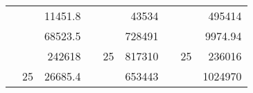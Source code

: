 \begin{table}[H]
\begin{tabular}{|ccrccrccc}
\rowcolor[HTML]{DAE8FC} 
\multicolumn{1}{|c|}{\cellcolor[HTML]{FFFFC7}}                                & \multicolumn{1}{c|}{\cellcolor[HTML]{DAE8FC}}                      & \multicolumn{1}{r|}{\cellcolor[HTML]{DAE8FC}11451.8}   & \multicolumn{1}{c|}{\cellcolor[HTML]{FFFFC7}}                                & \multicolumn{1}{c|}{\cellcolor[HTML]{DAE8FC}}                       & \multicolumn{1}{r|}{\cellcolor[HTML]{DAE8FC}43534}     & \multicolumn{1}{c|}{\cellcolor[HTML]{FFFFC7}}                                & \multicolumn{1}{c|}{\cellcolor[HTML]{DAE8FC}}                      & \multicolumn{1}{r|}{\cellcolor[HTML]{DAE8FC}495414}    \\ \cline{3-3} \cline{6-6} \cline{9-9} 
\multicolumn{1}{|c|}{\cellcolor[HTML]{FFFFC7}}                                & \multicolumn{1}{c|}{\cellcolor[HTML]{DAE8FC}}                      & \multicolumn{1}{r|}{\cellcolor[HTML]{DDFDFF}68523.5}   & \multicolumn{1}{c|}{\cellcolor[HTML]{FFFFC7}}                                & \multicolumn{1}{c|}{\cellcolor[HTML]{DAE8FC}}                       & \multicolumn{1}{r|}{\cellcolor[HTML]{DDFDFF}728491}    & \multicolumn{1}{c|}{\cellcolor[HTML]{FFFFC7}}                                & \multicolumn{1}{c|}{\cellcolor[HTML]{DAE8FC}}                      & \multicolumn{1}{r|}{\cellcolor[HTML]{DDFDFF}9974.94}   \\ \cline{3-3} \cline{6-6} \cline{9-9} 
\rowcolor[HTML]{DAE8FC} 
\multicolumn{1}{|c|}{\cellcolor[HTML]{FFFFC7}}                                & \multicolumn{1}{c|}{\cellcolor[HTML]{DAE8FC}}                      & \multicolumn{1}{r|}{\cellcolor[HTML]{DAE8FC}242618}    & \multicolumn{1}{c|}{\cellcolor[HTML]{FFFFC7}}                                & \multicolumn{1}{c|}{\multirow{-9}{*}{\cellcolor[HTML]{DAE8FC}25}}   & \multicolumn{1}{r|}{\cellcolor[HTML]{DAE8FC}817310}    & \multicolumn{1}{c|}{\cellcolor[HTML]{FFFFC7}}                                & \multicolumn{1}{c|}{\multirow{-9}{*}{\cellcolor[HTML]{DAE8FC}25}}  & \multicolumn{1}{r|}{\cellcolor[HTML]{DAE8FC}236016}    \\ \cline{3-3} \cline{5-6} \cline{8-9} 
\multicolumn{1}{|c|}{\cellcolor[HTML]{FFFFC7}}                                & \multicolumn{1}{c|}{\multirow{-10}{*}{\cellcolor[HTML]{DAE8FC}25}} & \multicolumn{1}{r|}{\cellcolor[HTML]{DDFDFF}26685.4}   & \multicolumn{1}{c|}{\cellcolor[HTML]{FFFFC7}}                                & \multicolumn{1}{c|}{\cellcolor[HTML]{DDFDFF}}                       & \multicolumn{1}{r|}{\cellcolor[HTML]{DAE8FC}653443}    & \multicolumn{1}{c|}{\cellcolor[HTML]{FFFFC7}}                                & \multicolumn{1}{c|}{\cellcolor[HTML]{DDFDFF}}                      & \multicolumn{1}{r|}{\cellcolor[HTML]{DAE8FC}1024970}   \\ \cline{2-3} \cline{6-6} \cline{9-9} 

\end{tabular}
\end{table}
